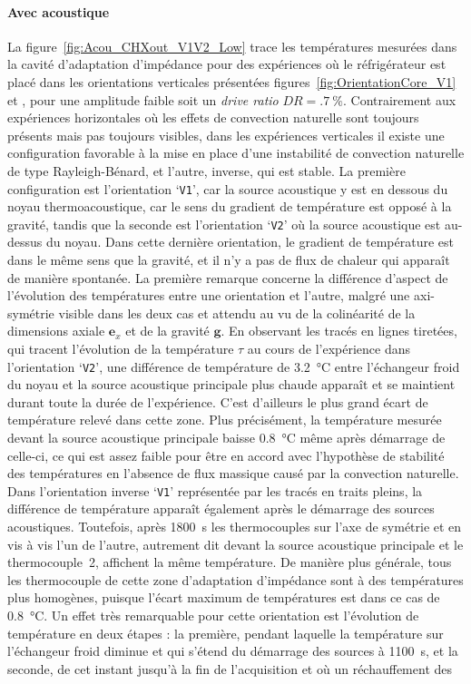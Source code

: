 \paragraph{Avec acoustique}
La figure~\ref{fig:Acou_CHXout_V1V2_Low} trace les températures mesurées dans la cavité d'adaptation d'impédance pour des expériences où le réfrigérateur est placé dans les orientations verticales présentées figures~\ref{fig:OrientationCore_V1} et , pour une amplitude \og faible \fg{} soit un \textit{drive ratio} $DR=\qty{.7}{\percent}$. Contrairement aux expériences horizontales où les effets de convection naturelle sont toujours présents mais pas toujours visibles, dans les expériences verticales il existe une configuration favorable à la mise en place d'une instabilité de convection naturelle de type Rayleigh-Bénard, et l'autre, inverse, qui est stable. La première configuration est l'orientation `\texttt{V1}', car la source acoustique y est en dessous du noyau thermoacoustique, car le sens du gradient de température est opposé à la gravité, tandis que la seconde est l'orientation `\texttt{V2}' où la source acoustique est au-dessus du noyau. Dans cette dernière orientation, le gradient de température est dans le même sens que la gravité, et il n'y a pas de flux de chaleur qui apparaît de manière spontanée. La première remarque concerne la différence d'aspect de l'évolution des températures entre une orientation et l'autre, malgré une axi-symétrie visible dans les deux cas et attendu au vu de la colinéarité de la dimensions axiale $\mathbf e_x$ et de la gravité $\mathbf g$. En observant les tracés en lignes tiretées, qui tracent l'évolution de la température $\tau$ au cours de l'expérience dans l'orientation `\texttt{V2}', une différence de température de \qty{3.2}{\degreeCelsius} entre l'échangeur froid du noyau et la source acoustique principale plus chaude apparaît et se maintient durant toute la durée de l'expérience. C'est d'ailleurs le plus grand écart de température relevé dans cette zone. Plus précisément, la température mesurée devant la source acoustique principale baisse \qty{.8}{\degreeCelsius} même après démarrage de celle-ci, ce qui est assez faible pour être en accord avec l'hypothèse de stabilité des températures en l'absence de flux massique causé par la convection naturelle. Dans l'orientation inverse `\texttt{V1}' représentée par les tracés en traits pleins, la différence de température apparaît également après le démarrage des sources acoustiques. Toutefois, après \qty{1800}{\second} les thermocouples sur l'axe de symétrie et en vis à vis l'un de l'autre, autrement dit devant la source acoustique principale et le thermocouple~2, affichent la même température. De manière plus générale, tous les thermocouple de cette zone d'adaptation d'impédance sont à des températures plus homogènes, puisque l'écart maximum de températures est dans ce cas de \qty{.8}{\degreeCelsius}. Un effet très remarquable pour cette orientation est l'évolution de température en deux étapes : la première, pendant laquelle la température sur l'échangeur froid diminue et qui s'étend du démarrage des sources à \qty{1100}{\second}, et la seconde, de cet instant jusqu'à la fin de l'acquisition et où un réchauffement des 